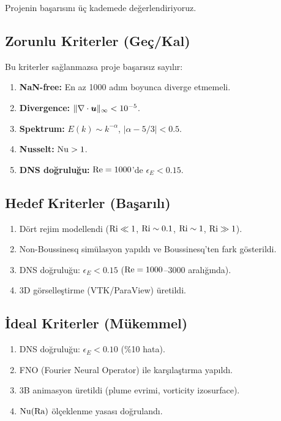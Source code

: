 Projenin başarısını üç kademede değerlendiriyoruz.

\subsection{Zorunlu Kriterler (Geç/Kal)}

Bu kriterler sağlanmazsa proje başarısız sayılır:

\begin{enumerate}
    \item \textbf{NaN-free:} En az 1000 adım boyunca diverge etmemeli.
    \item \textbf{Divergence:} $\| \nabla \cdot \bm{u} \|_\infty < 10^{-5}$.
    \item \textbf{Spektrum:} $E(k) \sim k^{-\alpha}$, $|\alpha - 5/3| < 0.5$.
    \item \textbf{Nusselt:} $\mathrm{Nu} > 1$.
    \item \textbf{DNS doğruluğu:} $\mathrm{Re} = 1000$'de $\epsilon_E < 0.15$.
\end{enumerate}

\subsection{Hedef Kriterler (Başarılı)}

\begin{enumerate}
    \item Dört rejim modellendi ($\mathrm{Ri} \ll 1$, $\mathrm{Ri} \sim 0.1$, $\mathrm{Ri} \sim 1$, $\mathrm{Ri} \gg 1$).
    \item Non-Boussinesq simülasyon yapıldı ve Boussinesq'ten fark gösterildi.
    \item DNS doğruluğu: $\epsilon_E < 0.15$ ($\mathrm{Re} = 1000$--$3000$ aralığında).
    \item 3D görselleştirme (VTK/ParaView) üretildi.
\end{enumerate}

\subsection{İdeal Kriterler (Mükemmel)}

\begin{enumerate}
    \item DNS doğruluğu: $\epsilon_E < 0.10$ (\%10 hata).
    \item FNO (Fourier Neural Operator) ile karşılaştırma yapıldı.
    \item 3B animasyon üretildi (plume evrimi, vorticity izosurface).
    \item $\mathrm{Nu}(\mathrm{Ra})$ ölçeklenme yasası doğrulandı.
\end{enumerate}


